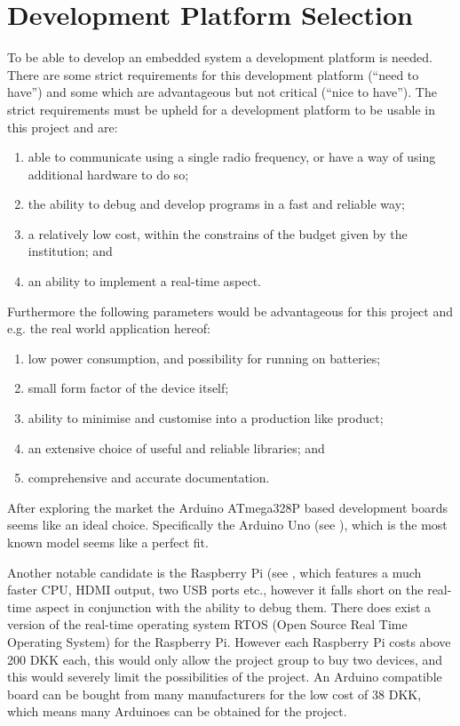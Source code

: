 
\section{Development Platform Selection}
To be able to develop an embedded system a development platform is needed. 
There are some strict requirements for this development platform (``need to have'') and some which are advantageous but not critical (``nice to have'').
The strict requirements must be upheld for a development platform to be usable in this project and are:

\begin{enumerate}[label=\itshape \alph*\upshape)]
\item able to communicate using a single radio frequency, or have a way of using additional hardware to do so;
\item the ability to debug and develop programs in a fast and reliable way;
\item a relatively low cost, within the constrains of the budget given by the institution;
and
\item an ability to implement a real-time aspect.
\end{enumerate}

Furthermore the following parameters would be advantageous for this project and e.g. the real world application hereof:
\begin{enumerate}[label=\itshape \alph*\upshape), resume]
\item low power consumption, and possibility for running on batteries;
\item small form factor of the device itself;
\item ability to minimise and customise into a production like product;
\item an extensive choice of useful and reliable libraries;
and
\item comprehensive and accurate documentation.
\end{enumerate}

\bigskip
After exploring the market the Arduino ATmega328P based development boards seems like an ideal choice.
Specifically the Arduino Uno (see \cite{ArduinoUNO}), which is the most known model seems like a perfect fit.

Another notable candidate is the Raspberry Pi (see \cite{RaspberryPI}, which features a much faster CPU, HDMI output, two USB ports etc., however it falls short on the real-time aspect in conjunction with the ability to debug them. 
There does exist a version of the real-time operating system RTOS (Open Source Real Time Operating System) for the Raspberry Pi.
However each Raspberry Pi costs above 200 DKK each, this would only allow the project group to buy two devices, and this would severely limit the possibilities of the project.
An Arduino compatible board can be bought from many manufacturers for the low cost of 38 DKK, which means many Arduinoes can be obtained for the project.

